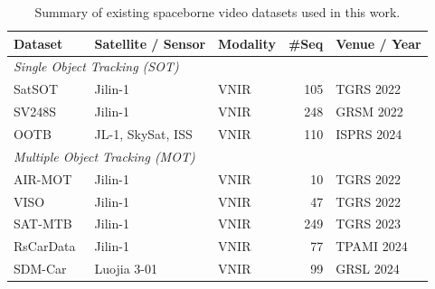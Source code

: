 \begin{table}[t]
\centering
\caption{Summary of existing spaceborne video datasets used in this work.}
\label{tab:spaceborne_video_datasets}
\setlength{\tabcolsep}{4pt}
\renewcommand{\arraystretch}{1.15}
\small
\begin{tabular}{l l l r l}
\toprule
\textbf{Dataset} & \textbf{Satellite / Sensor} & \textbf{Modality} & \textbf{\#Seq} & \textbf{Venue / Year} \\
\midrule
\multicolumn{5}{l}{\textit{Single Object Tracking (SOT)}} \\
SatSOT~\cite{satSOT2022}              & Jilin-1                      & VNIR & 105 & TGRS 2022  \\
SV248S~\cite{Li2022SV248S}            & Jilin-1                      & VNIR & 248 & GRSM 2022  \\
OOTB~\cite{CHEN2024212ootb}           & JL-1, SkySat, ISS            & VNIR & 110 & ISPRS 2024 \\
\midrule
\multicolumn{5}{l}{\textit{Multiple Object Tracking (MOT)}} \\
AIR-MOT~\cite{He2022TGraM}            & Jilin-1                      & VNIR &  10 & TGRS 2022  \\
VISO~\cite{yin2021viso}               & Jilin-1                      & VNIR &  47 & TGRS 2022  \\
SAT-MTB~\cite{Li2023SATMTB}           & Jilin-1                      & VNIR & 249 & TGRS 2023  \\
RsCarData~\cite{Xiao2024HiEUM}        & Jilin-1                      & VNIR &  77 & TPAMI 2024 \\
SDM-Car~\cite{Zhang2024SDMCar}        & Luojia 3-01                  & VNIR &  99 & GRSL 2024  \\
\bottomrule
\end{tabular}
\end{table}
